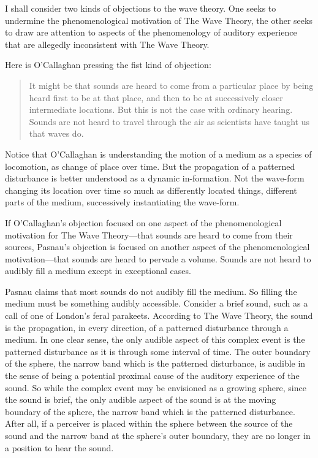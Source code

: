 \documentclass[12pt]{article}
\begin{document}
I shall consider two kinds of objections to the wave theory. One seeks to undermine the phenomenological motivation of The Wave Theory, the other seeks to draw are attention to aspects of the phenomenology of auditory experience that are allegedly inconsistent with The Wave Theory.

Here is O’Callaghan pressing the fist kind of objection:
\begin{quote}
	It might be that sounds are heard to come from a particular place by being heard first to be at that place, and then to be at successively closer intermediate locations. But this is not the case with ordinary hearing. Sounds are not heard to travel through the air as scientists have taught us that waves do. \citep[34]{OCallaghan:2007xy}
\end{quote}
Notice that O’Callaghan is understanding the motion of a medium as a species of locomotion, as change of place over time. But the propagation of a patterned disturbance is better understood as a dynamic in-formation. Not the wave-form changing its location over time so much as differently located things, different parts of the medium, successively instantiating the wave-form. 

If O’Callaghan’s objection focused on one aspect of the phenomenological motivation for The Wave Theory—that sounds are heard to come from their sources, Pasnau’s objection is focused on another aspect of the phenomenological motivation—that sounds are heard to pervade a volume. Sounds are not heard to audibly fill a medium except in exceptional cases.

Pasnau claims that most sounds do not audibly fill the medium. So filling the medium must be something audibly accessible. Consider a brief sound, such as a call of one of London's feral parakeets. According to The Wave Theory, the sound is the propagation, in every direction, of a patterned disturbance through a medium. In one clear sense, the only audible aspect of this complex event is the patterned disturbance as it is through some interval of time. The outer boundary of the sphere, the narrow band which is the patterned disturbance, is audible in the sense of being a potential proximal cause of the auditory experience of the sound. So while the complex event may be envisioned as a growing sphere, since the sound is brief, the only audible aspect of the sound is at the moving boundary of the sphere, the narrow band which is the patterned disturbance. After all, if a perceiver is placed within the sphere between the source of the sound and the narrow band at the sphere's outer boundary, they are no longer in a position to hear the sound. 
\end{document}
